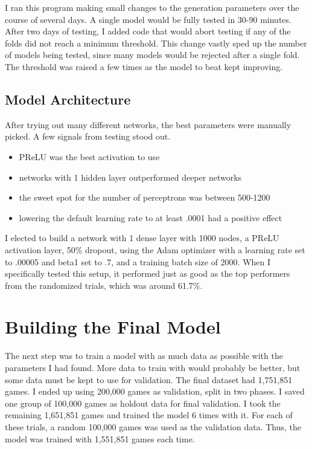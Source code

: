 \documentclass[twoside,twocolumn]{article}
\begin{document}
I ran this program making small changes to the generation parameters over the course of several days.  A single model would be fully tested in 30-90 minutes.  After two days of testing, I added code that would abort testing if any of the folds did not reach a minimum threshold.  This change vastly sped up the number of models being tested, since many models would be rejected after a single fold.  The threshold was raised a few times as the model to beat kept improving.  

\subsection {Model Architecture}

After trying out many different networks, the best parameters were manually picked.  A few signals from testing stood out. 

\begin{itemize}
\item PReLU was the best activation to use
\item networks with 1 hidden layer outperformed deeper networks
\item the sweet spot for the number of perceptrons was between 500-1200
\item lowering the default learning rate to at least .0001 had a positive effect
\end{itemize}

I elected to build a network with 1 dense layer with 1000 nodes, a PReLU activation layer,  50\% dropout, using the Adam optimizer with a learning rate set to .00005 and beta1 set to .7, and a training batch size of 2000.  When I specifically tested this setup, it performed just as good as the top performers from the randomized trials, which was around 61.7\%.

\section {Building the Final Model}

The next step was to train a model with as much data as possible with the parameters I had found.  More data to train with would probably be better, but some data must be kept to use for validation.  The final dataset had 1,751,851 games.  I ended up using 200,000 games as validation, split in two phases.  I saved one group of 100,000 games as holdout data for final validation.  I took the remaining 1,651,851 games and trained the model 6 times with it.  For each of these trials, a random 100,000 games was used as the validation data.  Thus, the model was trained with 1,551,851 games each time.
\end{document}
